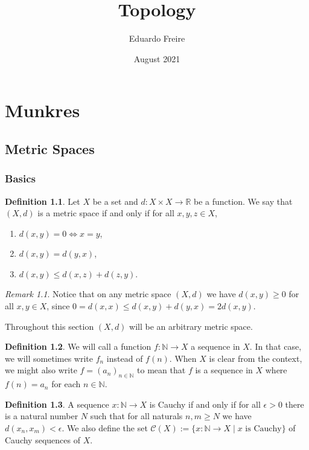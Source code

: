 \documentclass{report}
\title{Topology}
\author{Eduardo Freire}
\date{August 2021}
\theoremstyle{definition}
\newtheorem{definition}{Definition}[section]
\theoremstyle{remark}
\newtheorem{remark}{Remark}[section]
\newcommand{\N}{\mathbb{N}}
\newcommand{\R}{\mathbb{R}}
\newcommand{\set}[1]{\{#1\}}
\newcommand{\seq}[2][n \in \N]{\left( #2 \right)_{#1}}
\newcommand{\prt}[1]{\mathcal{#1}}
\begin{document}
\maketitle
\tableofcontents

\part{Munkres}
\chapter{Metric Spaces}
\section{Basics}

\begin{definition}
   Let $X$ be a set and $d: X \times X \to \R$ be a function. We say that $(X, d)$ is a metric space if and only if for all $x,y,z \in X$,
   \begin{enumerate}
       \item $d(x, y) = 0 \iff x = y$,
       \item $d(x, y) = d(y, x)$,
       \item $d(x, y) \leq d(x, z) + d(z, y)$.
   \end{enumerate}
\end{definition}

\begin{remark}
    Notice that on any metric space $(X, d)$ we have $d(x, y) \geq 0$ for all $x, y \in X$, since
    $0 = d(x, x) \leq d(x, y) + d(y, x) = 2 d(x, y)$.
\end{remark}

Throughout this section $(X, d)$ will be an arbitrary metric space.

\begin{definition}
   We will call a function $f : \N \to X$ a sequence in $X$. In that case, we will sometimes write $f_n$ instead of $f(n)$. When $X$ is clear from the context, we might also write $f = \seq{a_n}$ to mean that $f$ is a sequence in $X$ where $f(n) = a_n$ for each $n \in \N$.
\end{definition}

\begin{definition}
   A sequence $x: \N \to X$ is Cauchy if and only if for all $\epsilon > 0$ there is a natural number $N$ such that for all naturals $n,m \geq N$ we have $d(x_n, x_m) < \epsilon$. We also define the set $\prt{C}(X) := \set{x: \N \to X \mid \text{$x$ is Cauchy}}$ of Cauchy sequences of $X$.
\end{definition}
\end{document}

